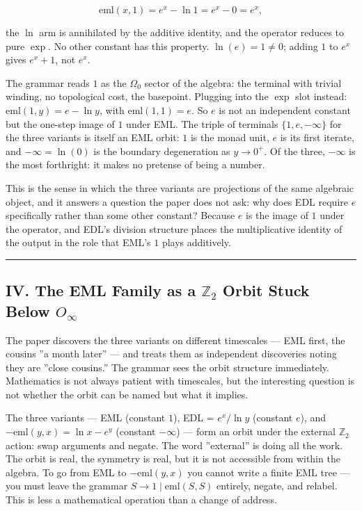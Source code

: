 \documentclass[12pt,a4paper]{article}
\begin{document}
\[\text{eml}(x, 1) = e^x - \ln 1 = e^x - 0 = e^x,\]


the $\ln$ arm is annihilated by the additive identity, and the operator reduces
to pure $\exp$. No other constant has this property. $\ln(e) = 1 \neq 0$; adding
$1$ to $e^x$ gives $e^x + 1$, not $e^x$.

The grammar reads $1$ as the $\Omega_0$ sector of the algebra: the terminal with
trivial winding, no topological cost, the basepoint. Plugging into the $\exp$ slot
instead: $\text{eml}(1, y) = e - \ln y$, with $\text{eml}(1,1) = e$. So $e$ is
not an independent constant but the one-step image of $1$ under EML. The triple
of terminals $\{1, e, -\infty\}$ for the three variants is itself an EML orbit:
$1$ is the monad unit, $e$ is its first iterate, and $-\infty = \ln(0)$ is the
boundary degeneration as $y \to 0^+$. Of the three, $-\infty$ is the most
forthright: it makes no pretense of being a number.

This is the sense in which the three variants are projections of the same
algebraic object, and it answers a question the paper does not ask: why does EDL
require $e$ specifically rather than some other constant? Because $e$ is the image
of $1$ under the operator, and EDL's division structure places the multiplicative
identity of the output in the role that EML's $1$ plays additively.

\begin{center}
\rule{0.5\textwidth}{0.4pt}
\end{center}

\subsection{IV. The EML Family as a $\mathbb{Z}_2$ Orbit Stuck Below $O_{\infty}$}

The paper discovers the three variants on different timescales --- EML first, the
cousins ''a month later'' --- and treats them as independent discoveries noting they
are ''close cousins.'' The grammar sees the orbit structure immediately. Mathematics
is not always patient with timescales, but the interesting question is not whether
the orbit can be named but what it implies.

The three variants --- EML (constant $1$), EDL = $e^x/\ln y$ (constant $e$), and
$-\text{eml}(y,x) = \ln x - e^y$ (constant $-\infty$) --- form an orbit under the
external $\mathbb{Z}_2$ action: swap arguments and negate. The word ''external'' is
doing all the work. The orbit is real, the symmetry is real, but it is not
accessible from within the algebra. To go from EML to $-\text{eml}(y,x)$ you
cannot write a finite EML tree --- you must leave the grammar $S \to 1 \mid
\text{eml}(S,S)$ entirely, negate, and relabel. This is less a mathematical
operation than a change of address.
\end{document}
